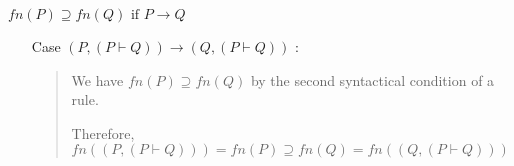 \begin{frame}[allowframebreaks]{
    $\mathit{fn}(P) \supseteq \mathit{fn}(Q) \mbox{ if } P \longrightarrow Q$
  }
\begin{itemize}
\begin{quote}
            Therefore,
            \(
            \mathit{fn}(Q)
            = \mathit{fn}(P)
            \supseteq \mathit{fn}(P')
            = \mathit{fn}(Q')
            \)
          \end{quote}
        \item[Case] \((P, (P \vdash Q)) \longrightarrow (Q, (P \vdash Q))\) :\\
          \begin{quote}
            We have \(\mathit{fn}(P) \supseteq \mathit{fn}(Q)\) 
            by the second syntactical condition of a rule.

            Therefore,
            \(
            \mathit{fn}((P, (P \vdash Q)))
            = \mathit{fn}(P)
            \supseteq \mathit{fn}(Q) 
            = \mathit{fn}((Q, (P \vdash Q)))
            \)
          \end{quote}
  \end{itemize}

\end{frame}


